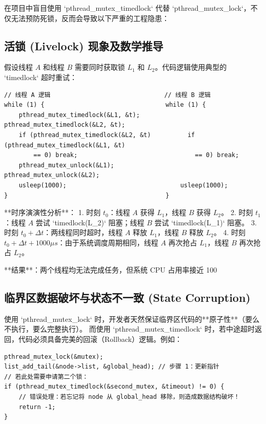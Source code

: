 \documentclass[12pt,a4paper]{article}
\begin{document}
在项目中盲目使用 `pthread\_mutex\_timedlock` 代替 `pthread\_mutex\_lock`，不仅无法预防死锁，反而会导致以下严重的工程隐患：

\subsection{活锁 (Livelock) 现象及数学推导}
假设线程 $A$ 和线程 $B$ 需要同时获取锁 $L_1$ 和 $L_2$。代码逻辑使用典型的 `timedlock` 超时重试：

\begin{lstlisting}
// 线程 A 逻辑                               // 线程 B 逻辑
while (1) {                                 while (1) {
    pthread_mutex_timedlock(&L1, &t);           pthread_mutex_timedlock(&L2, &t);
    if (pthread_mutex_timedlock(&L2, &t)          if (pthread_mutex_timedlock(&L1, &t)
        == 0) break;                                == 0) break;
    pthread_mutex_unlock(&L1);                  pthread_mutex_unlock(&L2);
    usleep(1000);                               usleep(1000);
}                                           }
\end{lstlisting}

**时序演演性分析**：
1. 时刻 $t_0$：线程 $A$ 获得 $L_1$，线程 $B$ 获得 $L_2$。
2. 时刻 $t_1$：线程 $A$ 尝试 `timedlock(L_2)` 阻塞；线程 $B$ 尝试 `timedlock(L_1)` 阻塞。
3. 时刻 $t_0 + \Delta t$：两线程同时超时，线程 $A$ 释放 $L_1$，线程 $B$ 释放 $L_2$。
4. 时刻 $t_0 + \Delta t + 1000\mu s$：由于系统调度周期相同，线程 $A$ 再次抢占 $L_1$，线程 $B$ 再次抢占 $L_2$。

**结果**：两个线程均无法完成任务，但系统 CPU 占用率接近 100%

\subsection{临界区数据破坏与状态不一致 (State Corruption)}
使用 `pthread\_mutex\_lock` 时，开发者天然保证临界区代码的**原子性**（要么不执行，要么完整执行）。
而使用 `pthread\_mutex\_timedlock` 时，若中途超时返回，代码必须具备完美的回滚（Rollback）逻辑。例如：

\begin{lstlisting}
pthread_mutex_lock(&mutex);
list_add_tail(&node->list, &global_head); // 步骤 1：更新指针
// 若此处需要申请第二个锁：
if (pthread_mutex_timedlock(&second_mutex, &timeout) != 0) {
    // 错误处理：若忘记将 node 从 global_head 移除，则造成数据结构破坏！
    return -1; 
}
\end{lstlisting}
\end{document}
